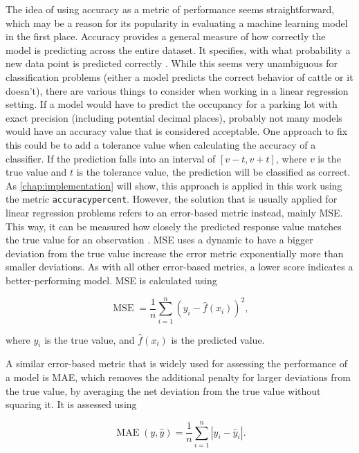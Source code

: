 The idea of using accuracy as a metric of performance seems straightforward, which may be a reason for its popularity in evaluating a machine learning model in the first place. Accuracy provides a general measure of how correctly the model is predicting across the entire dataset. It specifies, with what probability a new data point is predicted correctly \cite{grandini2020}. While this seems very unambiguous for classification problems (either a model predicts the correct behavior of cattle or it doesn’t), there are various things to consider when working in a linear regression setting. If a model would have to predict the occupancy for a parking lot with exact precision (including potential decimal places), probably not many models would have an accuracy value that is considered acceptable. One approach to fix this could be to add a tolerance value when calculating the accuracy of a classifier. If the prediction falls into an interval of $[v-t, v+t]$, where $v$ is the true value and $t$ is the tolerance value, the prediction will be classified as correct. As \autoref{chap:implementation} will show, this approach is applied in this work using the metric \texttt{accuracypercent}. However, the solution that is usually applied for linear regression problems refers to an error-based metric instead, mainly MSE. This way, it can be measured how closely the predicted response value matches the true value for an observation \cite{james2023}. MSE uses a dynamic to have a bigger deviation from the true value increase the error metric exponentially more than smaller deviations. As with all other error-based metrics, a lower score indicates a better-performing model. MSE is calculated using

\begin{equation}
\operatorname{MSE} = \frac{1}{n} \sum_{i=1}^n(y_i - \hat{f}(x_i))^2,
\label{mse}
\end{equation}

where $y_i$ is the true value, and $\hat{f}(x_i)$ is the predicted value.

A similar error-based metric that is widely used for assessing the performance of a model is MAE, which removes the additional penalty for larger deviations from the true value, by averaging the net deviation from the true value without squaring it. It is assessed using 

\begin{equation}
\operatorname{MAE}(y,\hat{y}) = \frac{1}{n} \sum_{i=1}^n |y_i - \hat{y}_i|.
\label{mae}
\end{equation}


